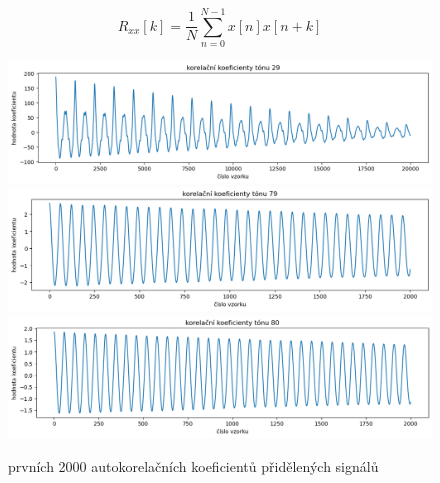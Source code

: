 \documentclass[a4paper, 12pt]{article}
\begin{document}
	\begin{equation}
		R_{xx}[k] = \frac{1}{N} \sum_{n = 0}^{N - 1} x[n]x[n + k] \label{korel}
	\end{equation}

	\begin{figure}[H]
		\includegraphics[width=\textwidth]{src/corel_a.png}
		\includegraphics[width=\textwidth]{src/corel_b.png}
		\includegraphics[width=\textwidth]{src/corel_c.png}
		\caption{prvních 2000 autokorelačních koeficientů přidělených signálů}
	\end{figure}
\end{document}
